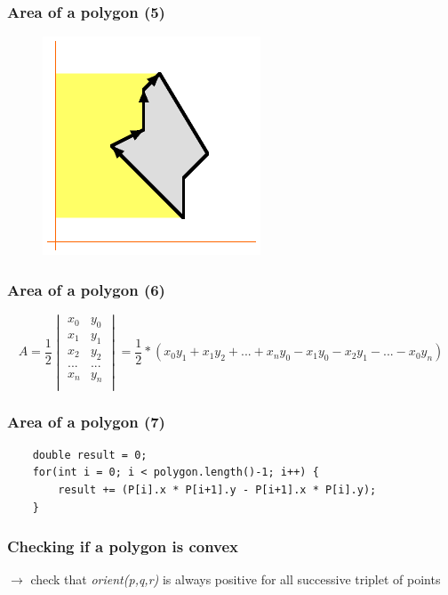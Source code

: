 \documentclass[pdf]{beamer}
\begin{document}
\begin{frame}
	\frametitle{Area of a polygon (5)}
	\begin{figure}
		\centering
		\includegraphics[width=0.7\linewidth]{area4}
	\end{figure}
\end{frame}


\begin{frame}
	\frametitle{Area of a polygon (6)}
	$$A=\frac{1}{2}\begin{vmatrix}
	x_0 & y_0 \\
	x_1 & y_1 \\
	x_2 & y_2 \\
	... & ... \\
	x_n & y_n \\
	\end{vmatrix}=\frac{1}{2}*(x_0y_1+x_1y_2+...+x_ny_0-x_1y_0-x_2y_1-...-x_0y_n)$$
\end{frame}

\begin{frame}[fragile]
	\frametitle{Area of a polygon (7)}
	\begin{lstlisting}
	double result = 0;
	for(int i = 0; i < polygon.length()-1; i++) {
		result += (P[i].x * P[i+1].y - P[i+1].x * P[i].y);
	}
	\end{lstlisting}
\end{frame}

\begin{frame}
	\frametitle{Checking if a polygon is convex}
	$\rightarrow$ check that \textit{orient(p,q,r)} is always positive for all successive triplet of points
\end{frame}
\end{document}
